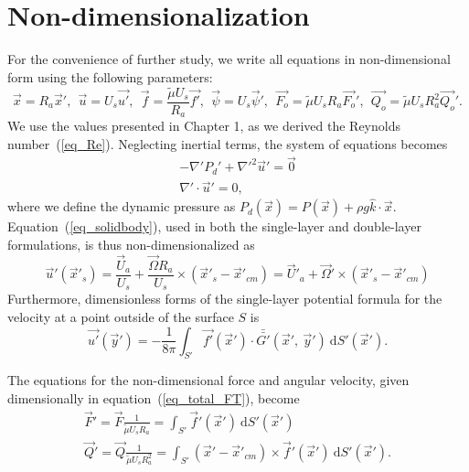\section{Non-dimensionalization}
\label{section3}
For the convenience of further study, we write all equations in non-dimensional form using the following parameters:
\begin{equation}
\vec{x} = R_a\vec{x}', 
\ \
 \vec{u} = U_s \vec{u'},
 \ \ 
  \vec{f} = \frac{\tilde{\mu} U_s}{R_a} \vec{f'},
  \ \ 
  \vec{\psi} = U_s \vec{\psi}',
  \ \ 
  \vec{F_o} = \tilde{\mu} U_s R_a \vec{F_o}',
  \ \
  \vec{Q_o} = \tilde{\mu} U_s R_a^2 \vec{Q_o}'.
\label{eq_nonD}
\end{equation}
We use the values presented in Chapter 1, as we derived the Reynolds number~(\ref{eq_Re}). 
Neglecting inertial terms, the system of equations becomes
\begin{align}
    -\nabla' P_d' +  \nabla'^2 \vec{u}'  = \vec{0}
	\label{eq_momentum_noD}
	\\
    \nabla' \cdot \vec{u}' = 0,
	\label{eq_conti_noD}
\end{align}
where we define the dynamic pressure as 
$P_d(\vec{x}) =  P(\vec{x}) + \rho g \hat{k} \cdot \vec{x}$.
Equation~(\ref{eq_solidbody}), used in both the single-layer and double-layer formulations, is thus non-dimensionalized as 
\begin{equation}
  \vec{u}'(\vec{x}'_s) = \frac{\vec{U}_a}{U_s} +  \frac{\vec{\Omega}R_a}{U_s} \times (\vec{x}'_s - \vec{x}'_{cm}) = \vec{U}'_a +  \vec{\Omega}' \times (\vec{x}'_s - \vec{x}'_{cm})
  \label{eq_solidbody_nonD}
\end{equation}
Furthermore, dimensionless forms of the single-layer potential formula for the velocity at a point outside of the surface $S$ is 
\begin{equation}
    \vec{u'}(\vec{y}') =
	- \frac{1}{8 \pi}
	\int_{S'}  \vec{f'}(\vec{x}') \cdot \bar{\bar{G'}}(\vec{x}', \ \vec{y}') \ \text{d}S'(\vec{x}').
    \label{eq_BI_sl_ND}
\end{equation}
\par
The equations for the non-dimensional force and angular velocity, given dimensionally in equation~(\ref{eq_total_FT}), become
\begin{align}
\vec{F}' =  \vec{F} \frac{1}{\tilde{\mu} U_s R_a}  =  \int_{S'} \vec{f}'(\vec{x}') \  \text{d}S'(\vec{x}')  
\label{eq_forcebal} 
\\  
 \vec{Q}' = \vec{Q} \frac{1}{\tilde{\mu} U_s R_a^2} =  \int_{S'} (\vec{x}' - \vec{x}'_{cm}) \times \vec{f}'(\vec{x}')  \ \text{d}S'(\vec{x}').  \label{eq_torquebal} 
\end{align}
